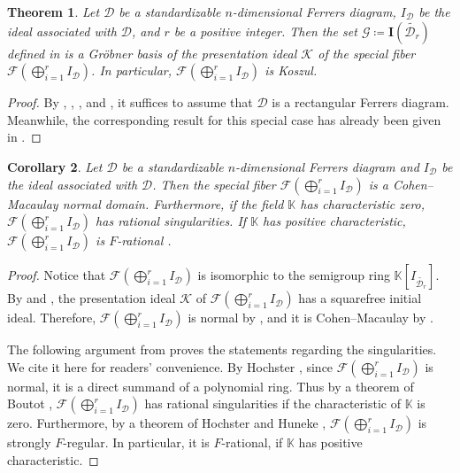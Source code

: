 \documentclass[11pt,a4paper,reqno,dvipsnames]{amsart}
\theoremstyle{plain}
\newtheorem{Theorem}{Theorem}[section]
\newtheorem{Corollary}[Theorem]{Corollary}
\theoremstyle{definition}
\newtheorem{Assumptions and Discussion}[Theorem]{Assumptions and Discussion}
\theoremstyle{remark}
\def\KK{{\mathbb K}}
\newcommand\bfI{\mathbf{I}}
\newcommand\calD{\mathcal{D}}
\newcommand\calF{\mathcal{F}}
\newcommand\calG{\mathcal{G}}
\newcommand\calK{\mathcal{K}}
\begin{document}
\begin{Theorem}
    \label{FiberD}
    Let $\calD$ be a standardizable $n$-dimensional Ferrers diagram, $I_{\calD}$ be the ideal associated with $\calD$, and $r$ be a positive integer. Then the set $\calG\coloneqq \bfI(\widetilde{\calD_r})$ defined in  is a Gr\"{o}bner basis of the presentation ideal $\calK$ of the special fiber $\calF(\bigoplus_{i=1}^{r}I_{ \calD})$. In particular, $\calF(\bigoplus_{i=1}^{r} I_{\calD})$ is Koszul.
\end{Theorem}
\begin{proof}
    By , , \cite[Proposition 4.13]{Sturmfels}, and \cite[Proposition 2.1]{DeNegri}, it suffices to assume that $\calD$ is a rectangular Ferrers diagram. Meanwhile, the corresponding result for this special case has already been given in .
\end{proof}

\begin{Corollary}
    \label{CMFiber}
    Let $\calD$ be a standardizable $n$-dimensional Ferrers diagram and $I_{\calD}$ be the ideal associated with $\calD$. Then the special fiber $\calF(\bigoplus_{i=1}^{r} I_{\calD})$ is a Cohen--Macaulay normal domain. 
    Furthermore, if the field $\KK$ has characteristic zero, $\calF(\bigoplus_{i=1}^{r} I_{\calD})$ has rational singularities. If $\KK$ has positive characteristic, $\calF(\bigoplus_{i=1}^{r} I_{\calD})$ is $F$-rational .
\end{Corollary}

\begin{proof}
    Notice that $\calF(\bigoplus_{i=1}^{r} I_{\calD})$ is isomorphic to the semigroup ring $\KK[I_{\widetilde{\calD_r}}]$.
    By  and , the presentation ideal $\calK$ of $\calF(\bigoplus_{i=1}^{r} I_{\calD})$ has a squarefree initial ideal. Therefore, $\calF(\bigoplus_{i=1}^{r} I_{\calD})$ is normal by \cite[Proposition 13.15]{Sturmfels}, and it is Cohen--Macaulay by
    \cite[Theorem 1]{Hochster}.

    The following argument from \cite[Corollary 2.3]{Sagbi} proves the statements regarding the singularities. We cite it here for readers' convenience.
    By Hochster \cite[Proposition 1]{Hochster}, since $\calF(\bigoplus_{i=1}^{r} I_{\calD})$ is normal, it is a direct summand of a polynomial ring. Thus by a theorem of Boutot \cite{Boutot}, $\calF(\bigoplus_{i=1}^{r} I_{\calD})$ has rational singularities if the characteristic of $\KK$ is zero.
    Furthermore, by a theorem of Hochster and Huneke \cite{MR1044348}, $\calF(\bigoplus_{i=1}^{r} I_{\calD})$ is strongly $F$-regular. In particular, it is $F$-rational, if $\KK$ has positive characteristic.
\end{proof}
\end{document}
